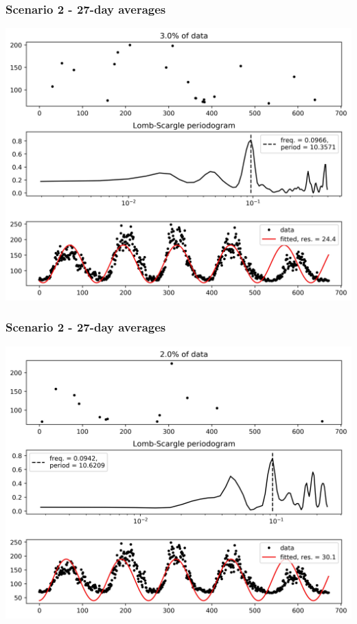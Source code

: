 \documentclass{beamer}
\begin{document}
\begin{frame}
\frametitle{Scenario 2 - 27-day averages}
\begin{center}
\includegraphics[scale=0.55]{../scripts/dataset2/periodograms_ny2.0_model1_pg0.97.jpg}
\end{center}
\end{frame}
\begin{frame}
\frametitle{Scenario 2 - 27-day averages}
\begin{center}
\includegraphics[scale=0.55]{../scripts/dataset2/periodograms_ny2.0_model1_pg0.98.jpg}
\end{center}
\end{frame}
\end{document}
